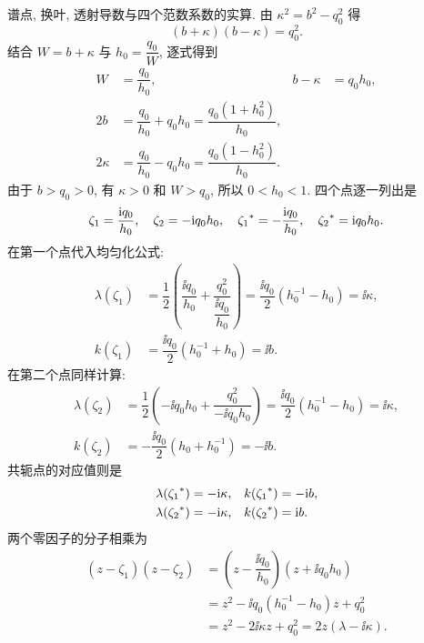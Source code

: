 \par\smallskip\noindent 谱点, 换叶, 透射导数与四个范数系数的实算.\quad
由 $\kappa^2=b^2-q_0^2$ 得
\begin{equation*}
(b+\kappa)(b-\kappa)=q_0^2.
\end{equation*}
结合 $W=b+\kappa$ 与 $h_0=\dfrac{q_0}{W}$, 逐式得到
\begin{equation*}
\begin{aligned}
W&=\dfrac{q_0}{h_0},&
b-\kappa&=q_0h_0,\\
2b&=\dfrac{q_0}{h_0}+q_0h_0
=\dfrac{q_0(1+h_0^2)}{h_0},\\
2\kappa&=\dfrac{q_0}{h_0}-q_0h_0
=\dfrac{q_0(1-h_0^2)}{h_0}.
\end{aligned}
\end{equation*}
由于 $b>q_0>0$, 有 $\kappa>0$ 和 $W>q_0$, 所以 $0<h_0<1$.
四个点逐一列出是
\begin{equation*}
\zeta_1=\dfrac{\mathrm{i} q_0}{h_0},\quad
\zeta_2=-\mathrm{i} q_0h_0,\quad
{\zeta_1}^{*}=-\dfrac{\mathrm{i} q_0}{h_0},\quad
{\zeta_2}^{*}=\mathrm{i} q_0h_0.
\end{equation*}
在第一个点代入均匀化公式:
\begin{equation*}
\begin{aligned}
\lambda(\zeta_1)
&=\dfrac{1}{2}\left(\dfrac{\ii q_0}{h_0}
+\dfrac{q_0^2}{\dfrac{\ii q_0}{h_0}}\right)
=\dfrac{\ii q_0}{2}(h_0^{-1}-h_0)=\ii\kappa,\\
k(\zeta_1)
&=\dfrac{\ii q_0}{2}(h_0^{-1}+h_0)=\ii b.
\end{aligned}
\end{equation*}
在第二个点同样计算:
\begin{equation*}
\begin{aligned}
\lambda(\zeta_2)
&=\dfrac{1}{2}\left(-\ii q_0h_0
+\dfrac{q_0^2}{-\ii q_0h_0}\right)
=\dfrac{\ii q_0}{2}(h_0^{-1}-h_0)=\ii\kappa,\\
k(\zeta_2)
&=-\dfrac{\ii q_0}{2}(h_0+h_0^{-1})=-\ii b.
\end{aligned}
\end{equation*}
共轭点的对应值则是
\begin{equation*}
\begin{aligned}
\lambda({\zeta_1}^{*})&=-\mathrm{i}\kappa,&
k({\zeta_1}^{*})&=-\mathrm{i} b,\\
\lambda({\zeta_2}^{*})&=-\mathrm{i}\kappa,&
k({\zeta_2}^{*})&=\mathrm{i} b.
\end{aligned}
\end{equation*}
两个零因子的分子相乘为
\begin{equation*}
\begin{aligned}
(z-\zeta_1)(z-\zeta_2)
&=\left(z-\dfrac{\ii q_0}{h_0}\right)
\left(z+\ii q_0h_0\right)\\
&=z^2-\ii q_0(h_0^{-1}-h_0)z+q_0^2\\
&=z^2-2\ii\kappa z+q_0^2
=2z(\lambda-\ii\kappa).
\end{aligned}
\end{equation*}
